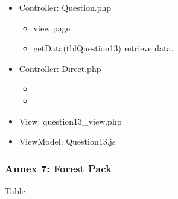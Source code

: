 \documentclass[letterpaper,10pt,english,openany,oneside]{sphinxmanual}
\begin{document}
\begin{sphinxVerbatim}[commandchars=\\\{\}]
               
  
               
\end{sphinxVerbatim}
\begin{itemize}
\item {} 
\sphinxAtStartPar
Controller: Question.php
\begin{itemize}
\item {} 
\sphinxAtStartPar
{} view page.

\item {} 
\sphinxAtStartPar
getData(tblQuestion13) retrieve data.

\end{itemize}

\item {} 
\sphinxAtStartPar
Controller: Direct.php
\begin{itemize}
\item {} 
\sphinxAtStartPar
{}

\item {} 
\sphinxAtStartPar
{}

\end{itemize}

\item {} 
\sphinxAtStartPar
View: question13\_view.php

\item {} 
\sphinxAtStartPar
ViewModel: Question13.js

\end{itemize}


\subsubsection{Annex 7: Forest Pack}
\label{\detokenize{module/module:annex-7-forest-pack}}
\sphinxAtStartPar
Table
\end{document}
